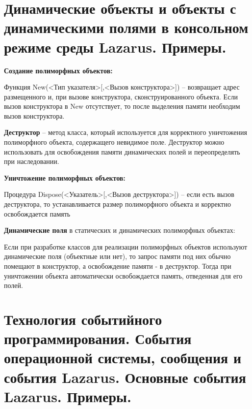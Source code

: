 \newpage\section{Динамические объекты и объекты с динамическими полями в консольном режиме среды 
Lazarus. Примеры. }

\begin{myquote}
            
\end{myquote}

{\bf{Создание полиморфных объектов:}}

Функция New(<Тип указателя>[,<Вызов конструктора>]) – возвращает адрес размещенного и, при вызове конструктора, сконструированного объекта. Если вызов конструктора в New отсутствует, то после выделения памяти необходим вызов конструктора. 

{\bf{Деструктор}} – метод класса, который используется для корректного уничтожения полиморфного объекта, содержащего невидимое поле. Деструктор можно использовать для освобождения памяти динамических полей и переопределять при наследовании.

{\bf{Уничтожение полиморфных объектов:}}

Процедура Dispose(<Указатель>[,<Вызов деструктора>]) – если есть вызов деструктора, то устанавливается размер полиморфного объекта и корректно освобождается память

{\bf{Динамические поля}} в статических и динамических полиморфных 
объектах:

Если при разработке классов для реализации полиморфных объектов используют динамические поля (объектные или нет), то запрос памяти под них обычно помещают в конструктор, а освобождение памяти - в деструктор. Тогда при 
уничтожении объекта автоматически освобождается память, отведенная для его полей.





\newpage\section{Технология  событийного  программирования.  События  операционной  системы,  сообщения и события Lazarus. Основные события Lazarus. Примеры.}

\begin{myquote}
            
\end{myquote}

